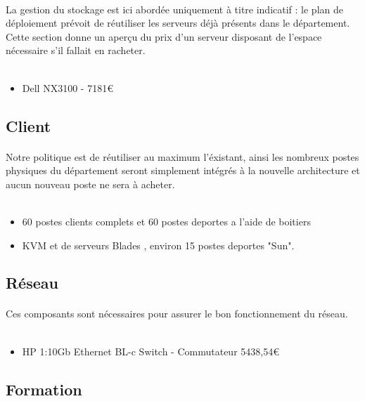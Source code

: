 \paragraph{} La gestion du stockage est ici abordée uniquement à titre indicatif : le plan de déploiement prévoit de réutiliser les serveurs déjà présents dans le département. Cette section donne un aperçu du prix d'un serveur disposant de l'espace nécessaire s'il fallait en racheter.
\\~
\begin{itemize}
 	\item Dell NX3100 - 7181€
\end{itemize}

\subsection{Client}

\paragraph{} Notre politique est de réutiliser au maximum l'éxistant, ainsi les nombreux postes physiques du département seront simplement intégrés à la nouvelle architecture et aucun nouveau poste ne sera à acheter.
\\~
\begin{itemize}
	\item 60 postes clients complets et 60 postes deportes a l'aide de boitiers
	\item KVM et de serveurs Blades , environ 15 postes deportes "Sun".
\end{itemize}

\subsection{Réseau}

\paragraph{} Ces composants sont nécessaires pour assurer le bon fonctionnement du réseau.
\\~
\begin{itemize}
	\item HP 1:10Gb Ethernet BL-c Switch - Commutateur 5438,54€
\end{itemize}

\subsection{Formation}


